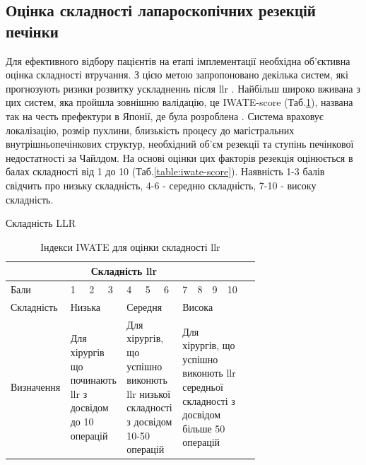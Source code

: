 \begin{refsection}
\subsection{Оцінка складності лапароскопічних резекцій печінки}
Для ефективного відбору пацієнтів на етапі імплементації необхідна об'єк\-тивна оцінка складності втручання. З цією метою запропоновано декілька систем, які прогнозують ризики розвитку ускладненнь після \acrshort{llr} \cite{Kawaguchi2018, Hasegawa2017a}. Найбільш широко вживана з цих систем, яка пройшла зовнішню валідацію, це IWATE-score (Таб.\ref{table:iwate}), названа так на честь префектури в Японії, де була розроблена \cite{Ban2014}. Система враховує локалізацію, розмір пухлини, близькість процесу до магістральних внутрішньопечінкових структур, необхідний об'єм резекції та  ступінь печінкової недостатності за Чайлдом. На основі оцінки цих факторів резекція оцінюється в балах складності від 1 до 10 (Таб.\ref{table:iwate-score}). Наявність 1-3 балів свідчить про низьку складність, 4-6 - середню складність, 7-10 - високу складність. 

Складність LLR
\begin{table}
\begin{tabular}{ |p{0.15\linewidth} |p{0.05\linewidth} |p{0.05\linewidth}|p{0.05\linewidth}|p{0.05\linewidth}|p{0.05\linewidth}|p{0.05\linewidth}|p{0.05\linewidth}|p{0.05\linewidth}|p{0.05\linewidth}|p{0.05\linewidth}|p{0.05\linewidth}| }
\hline
\multicolumn{11}{|c|}{Складність \acrshort{llr}} \\
\hline
Бали & 1 & 2 & 3 & 4 & 5 & 6 & 7 & 8 & 9 & 10 \\
\hline
Складність   & \multicolumn{3}{p{0.15\linewidth}|}{Низька} & \multicolumn{3}{p{0.15\linewidth}|}{Середня} & \multicolumn{4}{p{0.20\linewidth}|}{Висока} \\
\hline
Визначення   & \multicolumn{3}{p{0.20\linewidth}|}{Для хірургів що починають \acrshort{llr} з досвідом до 10 операцій} & \multicolumn{3}{p{0.20\linewidth}|}{Для хірургів, що успішно виконють \acrshort{llr} низької складності з досвідом 10-50 операцій } & \multicolumn{4}{p{0.25\linewidth}|}{Для хірургів, що успішно виконють \acrshort{llr} середньої складності з досвідом більше 50 операцій } \\
\hline
\end{tabular}

\caption{\label{table:iwate}Індекси IWATE для оцінки складності \acrshort{llr} }
\end{table}






\end{refsection}
